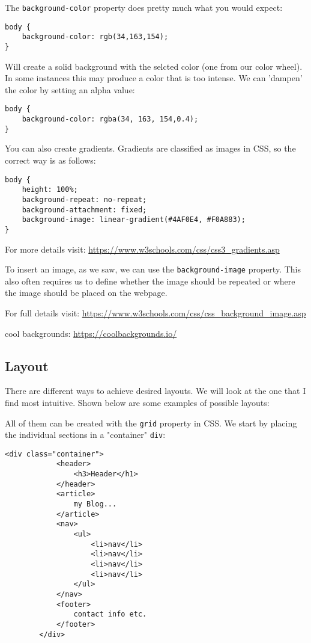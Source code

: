 \documentclass[11pt,a4paper]{report}
\begin{document}
The \verb|background-color| property does pretty much what you would expect: 
\begin{lstlisting}[style=htmlcssjs]
body { 
	background-color: rgb(34,163,154);
}
\end{lstlisting}
Will create a solid background with the selcted color (one from our color wheel). In some instances this may produce a color that is too intense. We can 'dampen' the color by setting an alpha value: 
\begin{lstlisting}[style=htmlcssjs]
body {
    background-color: rgba(34, 163, 154,0.4);
}
\end{lstlisting}
You can also create gradients. Gradients are classified as images in CSS, so the correct way is as follows:
\begin{lstlisting}[style=htmlcssjs]
body {
    height: 100%;
    background-repeat: no-repeat;
    background-attachment: fixed;
    background-image: linear-gradient(#4AF0E4, #F0A883);
}
\end{lstlisting} 
For more details visit: \url{https://www.w3schools.com/css/css3_gradients.asp}

To insert an image, as we saw, we can use the \verb|background-image| property. This also often requires us to define whether the image should be repeated or where the image should be placed on the webpage.

For full details visit: \url{https://www.w3schools.com/css/css_background_image.asp}

cool backgrounds: \url{https://coolbackgrounds.io/}

\subsection{Layout}

There are different ways to achieve desired layouts. We will look at the one that I find most intuitive. Shown below are some examples of possible layouts:

\begin{multicols}{3}



\end{multicols}

All of them can be created with the \verb|grid| property in CSS.  We start by placing the individual sections in a "container" \verb|div|: 
\begin{lstlisting}[style=htmlcssjs]
<div class="container">
            <header>
                <h3>Header</h1>
            </header>
            <article>
                my Blog...
            </article>
            <nav>
                <ul>
                    <li>nav</li>
                    <li>nav</li>
                    <li>nav</li>
                    <li>nav</li>
                </ul>
            </nav>
            <footer>
                contact info etc.
            </footer>
        </div>
\end{lstlisting}
\end{document}
